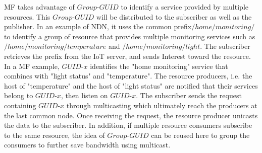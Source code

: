 MF takes advantage of  $Group$-$GUID$ to identify a service provided by multiple resources. This $Group$-$GUID$ will be distributed to the subscriber as well as the publisher. In an example of NDN,  it uses the common prefix$/home/monitoring/$ to identify a group of resource that provides multiple monitoring services such as $/home/monitoring/temperature$ and $/home/monitoring/light$. The subscriber retrieves the prefix from the IoT server, and sends Interest toward the resource. In a MF example, $GUID$-$x$ identifies the "home monitoring" service that combines with "light status" and "temperature". The resource producers, i.e. the host of "temperature" and the host of "light status" are notified that their services belong to $GUID$-$x$, then listen on $GUID$-$x$. The subscriber sends the request containing  $GUID$-$x$ through multicasting which ultimately reach the producers at the last common node. Once receiving the request, the resource producer unicasts the data to the subscriber. In addition, if multiple resource consumers subscribe to the same resource, the idea of $Group$-$GUID$ can be reused here to group the consumers to further save bandwidth using multicast.

